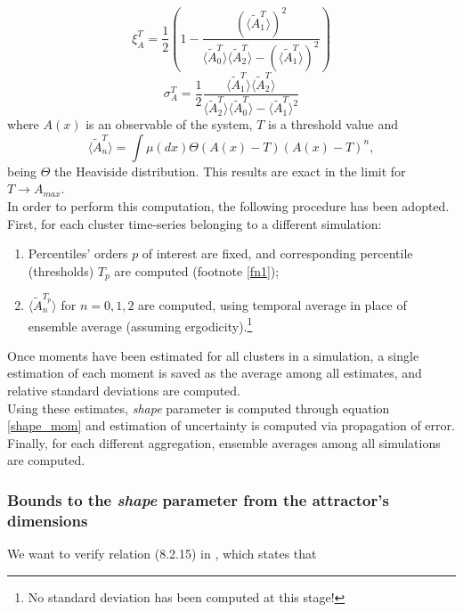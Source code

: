\documentclass{article}
\begin{document}
\begin{equation}
\xi_A^{T} = \frac{1}{2}\left(1-\frac{(\langle\tilde{A}_1^{T}\rangle)^2}{\langle\tilde{A}_0^T\rangle \langle\tilde{A}_2^T\rangle - (\langle\tilde{A}_1^{T}\rangle)^2} \right) \label{shape_mom}
\end{equation}
\begin{equation}
\sigma_A^{T} = \frac{1}{2} \frac{\langle\tilde{A}_1^T\rangle \langle\tilde{A}_2^T\rangle} {\langle\tilde{A}_2^T\rangle \langle\tilde{A}_0^T\rangle - \langle\tilde{A}_1^{T}\rangle^2}
\end{equation}
where $A(x)$ is an observable of the system, $T$ is a threshold value and
\begin{equation}
\langle\tilde{A}_n^T\rangle = \int\mu(dx)\Theta(A(x)-T)(A(x)-T)^n,
\end{equation}
being $\Theta$ the Heaviside distribution. This results are exact in the limit for $T \rightarrow A_{max}$.\\
In order to perform this computation, the following procedure has been adopted. First, for each cluster time-series belonging to a different simulation:
\begin{enumerate}
	\item Percentiles' orders $p$ of interest are fixed, and corresponding percentile (thresholds) $T_p$ are computed (footnote \ref{fn1});
	\item $\langle\tilde{A}_n^{T_p}\rangle$ for $n=0,1,2$ are computed, using temporal average in place of ensemble average (assuming ergodicity).\footnote{No standard deviation has been computed at this stage!}
\end{enumerate}
Once moments have been estimated for all clusters in a simulation, a single estimation of each moment is saved as the average among all estimates, and relative standard deviations are computed.\\
Using these estimates, \textit{shape} parameter is computed through equation \ref{shape_mom} and estimation of uncertainty is computed via propagation of error. Finally, for each different aggregation, ensemble averages among all simulations are computed.

\subsubsection{Bounds to the \textit{shape} parameter from the attractor's dimensions}

We want to verify relation (8.2.15) in \cite{LucariniExtremesBook}, which states that
\end{document}
